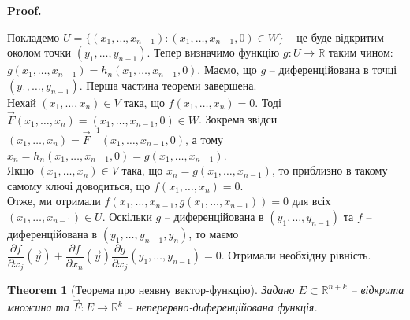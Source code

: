 \documentclass[a4paper, 10pt]{article}
\makeatletter
\def\departial#1#2{\dfrac{\partial {#1}}{\partial {#2}}}
\theoremstyle{theoremdd}
\newtheorem{theorem}{Theorem}[subsection]
\theoremstyle{theoremdd}
\theoremstyle{theoremdd}
\theoremstyle{theoremdd}
\theoremstyle{theoremdd}
\theoremstyle{theoremdd}
\theoremstyle{theoremdd}
\theoremstyle{theoremdd}
\theoremstyle{theoremdd}
\renewenvironment{proof}[1][Proof.\\]{\par
\pushQED{\hfill \qed}%
\normalfont \topsep6\p@\@plus6\p@\relax
\trivlist
\item\relax
{\bfseries
#1\@addpunct{.}}\hspace\labelsep\ignorespaces
}{%
\popQED\endtrivlist\@endpefalse
}
\makeatother
\begin{document}
\begin{proof}
Покладемо $U = \{(x_1,\dots,x_{n-1}) : (x_1,\dots,x_{n-1},0) \in W\}$ -- це буде відкритим околом точки $(y_1,\dots,y_{n-1})$. Тепер визначимо функцію $g \colon U \to \mathbb{R}$ таким чином: $g(x_1,\dots,x_{n-1}) = h_n(x_1,\dots,x_{n-1},0)$. Маємо, що $g$ -- диференційована в точці $(y_1,\dots,y_{n-1})$. Перша частина теореми завершена.\\
Нехай $(x_1,\dots,x_n) \in V$ така, що $f(x_1,\dots,x_n) = 0$. Тоді $\vec{F}(x_1,\dots,x_n) = (x_1,\dots,x_{n-1},0) \in W$. Зокрема звідси $(x_1,\dots,x_n) = \vec{F}^{-1}(x_1,\dots,x_{n-1},0)$, а тому $x_n = h_n(x_1,\dots,x_{n-1},0) = g(x_1,\dots,x_{n-1})$.\\
Якщо $(x_1,\dots,x_n) \in V$ така, що $x_n = g(x_1,\dots,x_{n-1})$, то приблизно в такому самому ключі доводиться, що $f(x_1,\dots,x_n) = 0$.\\
Отже, ми отримали $f(x_1,\dots,x_{n-1},g(x_1,\dots,x_{n-1})) = 0$ для всіх $(x_1,\dots,x_{n-1}) \in U$. Оскільки $g$ -- диференційована в $(y_1,\dots,y_{n-1})$ та $f$ -- диференційована в $(y_1,\dots,y_{n-1},y_n)$, то маємо\\
$\departial{f}{x_j}(\vec{y}) + \departial{f}{x_n}(\vec{y}) \departial{g}{x_j}(y_1,\dots,y_{n-1}) = 0$. Отримали необхідну рівність.
\end{proof}

\begin{theorem}[Теорема про неявну вектор-функцію]
Задано $E \subset \mathbb{R}^{n+k}$ -- відкрита множина та $\vec{F} \colon E \to \mathbb{R}^k$ -- неперервно-диференційована функція.
\end{theorem}
\end{document}
